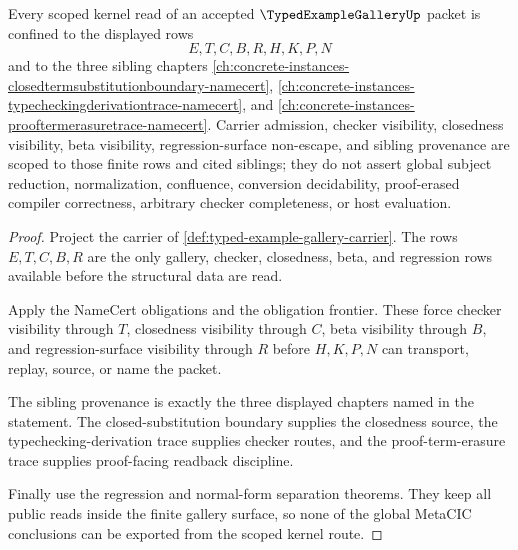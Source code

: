 \begin{theorem}
\label{thm:typed-example-gallery-scoped-kernel-route}
Every scoped kernel read of an accepted $\TypedExampleGalleryUp$ packet is confined to the displayed rows
$$
E,T,C,B,R,H,K,P,N
$$
and to the three sibling chapters \autoref{ch:concrete-instances-closedtermsubstitutionboundary-namecert}, \autoref{ch:concrete-instances-typecheckingderivationtrace-namecert}, and \autoref{ch:concrete-instances-prooftermerasuretrace-namecert}. Carrier admission, checker visibility, closedness visibility, beta visibility, regression-surface non-escape, and sibling provenance are scoped to those finite rows and cited siblings; they do not assert global subject reduction, normalization, confluence, conversion decidability, proof-erased compiler correctness, arbitrary checker completeness, or host evaluation.
\end{theorem}
\begin{proof}
Project the carrier of \autoref{def:typed-example-gallery-carrier}. The rows $E,T,C,B,R$ are the only gallery, checker, closedness, beta, and regression rows available before the structural data are read.

Apply the NameCert obligations and the obligation frontier. These force checker visibility through $T$, closedness visibility through $C$, beta visibility through $B$, and regression-surface visibility through $R$ before $H,K,P,N$ can transport, replay, source, or name the packet.

The sibling provenance is exactly the three displayed chapters named in the statement. The closed-substitution boundary supplies the closedness source, the typechecking-derivation trace supplies checker routes, and the proof-term-erasure trace supplies proof-facing readback discipline.

Finally use the regression and normal-form separation theorems. They keep all public reads inside the finite gallery surface, so none of the global MetaCIC conclusions can be exported from the scoped kernel route.
\end{proof}

